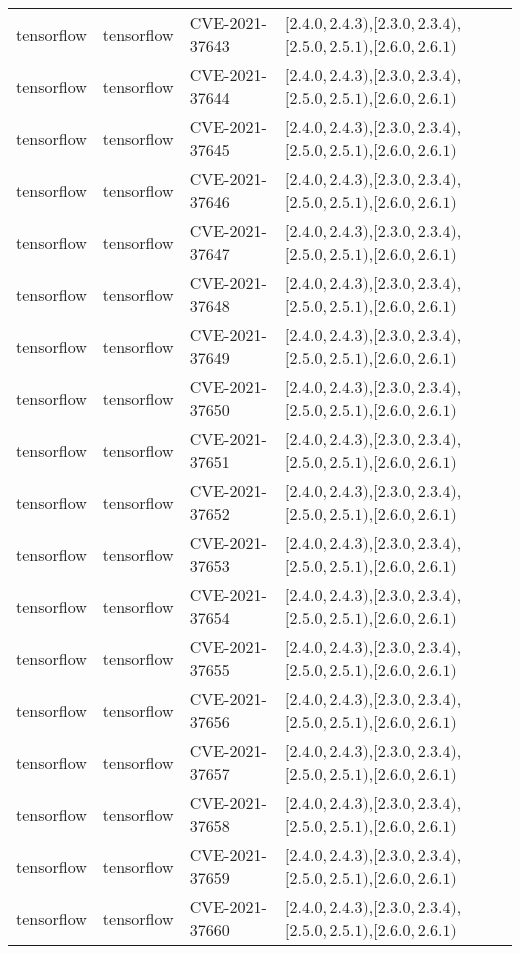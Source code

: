 \begin{tabular}{llll}
tensorflow & tensorflow & CVE-2021-37643 & $[2.4.0,2.4.3)$,$[2.3.0,2.3.4)$,$[2.5.0,2.5.1)$,$[2.6.0,2.6.1)$ \\
tensorflow & tensorflow & CVE-2021-37644 & $[2.4.0,2.4.3)$,$[2.3.0,2.3.4)$,$[2.5.0,2.5.1)$,$[2.6.0,2.6.1)$ \\
tensorflow & tensorflow & CVE-2021-37645 & $[2.4.0,2.4.3)$,$[2.3.0,2.3.4)$,$[2.5.0,2.5.1)$,$[2.6.0,2.6.1)$ \\
tensorflow & tensorflow & CVE-2021-37646 & $[2.4.0,2.4.3)$,$[2.3.0,2.3.4)$,$[2.5.0,2.5.1)$,$[2.6.0,2.6.1)$ \\
tensorflow & tensorflow & CVE-2021-37647 & $[2.4.0,2.4.3)$,$[2.3.0,2.3.4)$,$[2.5.0,2.5.1)$,$[2.6.0,2.6.1)$ \\
tensorflow & tensorflow & CVE-2021-37648 & $[2.4.0,2.4.3)$,$[2.3.0,2.3.4)$,$[2.5.0,2.5.1)$,$[2.6.0,2.6.1)$ \\
tensorflow & tensorflow & CVE-2021-37649 & $[2.4.0,2.4.3)$,$[2.3.0,2.3.4)$,$[2.5.0,2.5.1)$,$[2.6.0,2.6.1)$ \\
tensorflow & tensorflow & CVE-2021-37650 & $[2.4.0,2.4.3)$,$[2.3.0,2.3.4)$,$[2.5.0,2.5.1)$,$[2.6.0,2.6.1)$ \\
tensorflow & tensorflow & CVE-2021-37651 & $[2.4.0,2.4.3)$,$[2.3.0,2.3.4)$,$[2.5.0,2.5.1)$,$[2.6.0,2.6.1)$ \\
tensorflow & tensorflow & CVE-2021-37652 & $[2.4.0,2.4.3)$,$[2.3.0,2.3.4)$,$[2.5.0,2.5.1)$,$[2.6.0,2.6.1)$ \\
tensorflow & tensorflow & CVE-2021-37653 & $[2.4.0,2.4.3)$,$[2.3.0,2.3.4)$,$[2.5.0,2.5.1)$,$[2.6.0,2.6.1)$ \\
tensorflow & tensorflow & CVE-2021-37654 & $[2.4.0,2.4.3)$,$[2.3.0,2.3.4)$,$[2.5.0,2.5.1)$,$[2.6.0,2.6.1)$ \\
tensorflow & tensorflow & CVE-2021-37655 & $[2.4.0,2.4.3)$,$[2.3.0,2.3.4)$,$[2.5.0,2.5.1)$,$[2.6.0,2.6.1)$ \\
tensorflow & tensorflow & CVE-2021-37656 & $[2.4.0,2.4.3)$,$[2.3.0,2.3.4)$,$[2.5.0,2.5.1)$,$[2.6.0,2.6.1)$ \\
tensorflow & tensorflow & CVE-2021-37657 & $[2.4.0,2.4.3)$,$[2.3.0,2.3.4)$,$[2.5.0,2.5.1)$,$[2.6.0,2.6.1)$ \\
tensorflow & tensorflow & CVE-2021-37658 & $[2.4.0,2.4.3)$,$[2.3.0,2.3.4)$,$[2.5.0,2.5.1)$,$[2.6.0,2.6.1)$ \\
tensorflow & tensorflow & CVE-2021-37659 & $[2.4.0,2.4.3)$,$[2.3.0,2.3.4)$,$[2.5.0,2.5.1)$,$[2.6.0,2.6.1)$ \\
tensorflow & tensorflow & CVE-2021-37660 & $[2.4.0,2.4.3)$,$[2.3.0,2.3.4)$,$[2.5.0,2.5.1)$,$[2.6.0,2.6.1)$ \\

\end{tabular}
